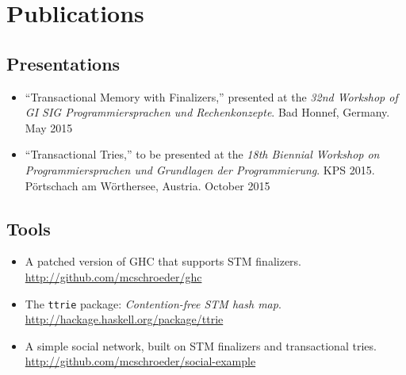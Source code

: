 \chapter{Publications}

\section*{Presentations}
\begin{itemize}
\item ``Transactional Memory with Finalizers,'' presented at the \textit{32nd Workshop of GI SIG Programmiersprachen und Rechenkonzepte}. Bad Honnef, Germany. May 2015
\item ``Transactional Tries,'' to be presented at the \textit{18th Biennial Workshop on Programmiersprachen und Grundlagen der Programmierung}. KPS 2015. Pörtschach am Wörthersee, Austria. October 2015
\end{itemize}

\section*{Tools}
\begin{itemize}
\item A patched version of GHC that supports STM finalizers.\\ \url{http://github.com/mcschroeder/ghc}
\item The \texttt{ttrie} package: \textit{Contention-free STM hash map}.\\ \url{http://hackage.haskell.org/package/ttrie}
\item A simple social network, built on STM finalizers and transactional tries.\\ \url{http://github.com/mcschroeder/social-example}
\end{itemize}
